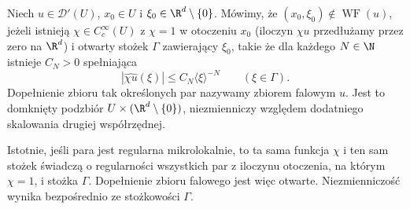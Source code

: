 \begin{definicja}\label{def:pde31-wf}
Niech $u\in\mathcal D'(U)$, $x_0\in U$ i
$\xi_0\in\R^d\setminus\{0\}$. Mówimy, że
$(x_0,\xi_0)\notin\operatorname{WF}(u)$, jeżeli istnieją
$\chi\in C_c^\infty(U)$ z $\chi=1$ w otoczeniu $x_0$
(iloczyn $\chi u$ przedłużamy przez zero na $\R^d$)
i otwarty stożek $\Gamma$ zawierający $\xi_0$, takie że dla każdego
$N\in\N$ istnieje $C_N>0$ spełniająca
\begin{equation}\label{eq:pde31-wf-decay}
 |\widehat{\chi u}(\xi)|\le C_N\langle\xi\rangle^{-N}
 \qquad(\xi\in\Gamma).
\end{equation}
Dopełnienie zbioru tak określonych par nazywamy zbiorem falowym $u$.
Jest to domknięty podzbiór $U\times(\R^d\setminus\{0\})$,
niezmienniczy względem dodatniego skalowania drugiej współrzędnej.
\end{definicja}
Istotnie, jeśli para jest regularna mikrolokalnie,
to ta sama funkcja $\chi$ i ten sam stożek świadczą
o regularności wszystkich par z iloczynu otoczenia,
na którym $\chi=1$, i stożka $\Gamma$.
Dopełnienie zbioru falowego jest więc otwarte.
Niezmienniczość wynika bezpośrednio ze stożkowości
$\Gamma$.

